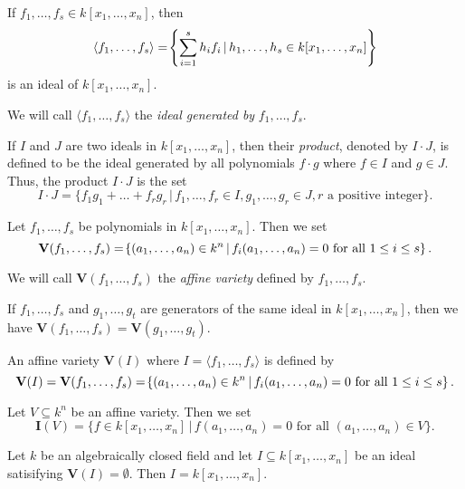 \documentclass[../main.tex]{subfiles}
\begin{document}
   \begin{lemma}
      If $f_1,\dots, f_s\in k[x_1,\dots,x_n]$, then 
      $$\langle f_1,\dots,f_s\rangle = \lr\{\}{\sum^s_{i=1}h_if_i\,|\,h_1,\dots,h_s\in k[x_1,\dots,x_n]}$$ 
      is an ideal of $k[x_1,\dots,x_n]$.
   \end{lemma}
   We will call $\langle f_1,\dots,f_s\rangle$ the \emph{ideal generated by} $f_1,\dots,f_s$.
   \begin{definition}
      If $I$ and $J$ are two ideals in $k[x_1,\dots,x_n]$, then their \emph{product}, denoted by $I\cdot J$, is defined to be the ideal generated by all polynomials $f\cdot g$ where $f\in I$ and $g\in J$. Thus, the product $I\cdot J$ is the set
      $$I\cdot J=\{f_1g_1+\dots+f_rg_r\,|\,f_1,\dots,f_r\in I, g_1,\dots,g_r\in J, r \text{ a positive integer}\}.$$
   \end{definition}
   \begin{definition}
      Let $f_1,\dots,f_s$ be polynomials in $k[x_1,\dots,x_n]$. Then we set
      $$\mathbf{V}(f_1,\dots,f_s) = \lr\{\}{(a_1,\dots,a_n)\in k^n \,|\, f_i(a_1,\dots,a_n)=0 \text{ for all $1\leq i\leq s$}}.$$
   \end{definition}
   We will call $\mathbf{V}(f_1,\dots,f_s)$ the \emph{affine variety} defined by $f_1,\dots,f_s$.
   \begin{lemma}
      If $f_1,\dots,f_s$ and $g_1,\dots,g_t$ are generators of the same ideal in $k[x_1,\dots,x_n]$, then we have $\mathbf{V}(f_1,\dots,f_s)=\mathbf{V}(g_1,\dots,g_t)$.
   \end{lemma}
   \begin{definition}
      An affine variety $\mathbf{V}(I)$ where $I=\langle f_1,\dots,f_s\rangle$ is defined by
      $$\mathbf{V}(I)=\mathbf{V}(f_1,\dots,f_s) = \lr\{\}{(a_1,\dots,a_n)\in k^n \, |\, f_i(a_1,\dots,a_n)=0 \text{ for all $1\leq i\leq s$}}.$$
   \end{definition}
   \begin{definition}
      Let $V\subseteq k^n$ be an affine variety. Then we set
      $$\mathbf{I}(V)=\{f\in k[x_1,\dots,x_n] \, |\, f(a_1,\dots,a_n)=0 \text{ for all $(a_1,\dots,a_n)\in V$}\}.$$
   \end{definition}

   \begin{theorem}
      Let $k$ be an algebraically closed field and let $I\subseteq k[x_1,\dots,x_n]$ be an ideal satisifying $\mathbf{V}(I)=\emptyset$. Then $I=k[x_1,\dots,x_n]$.
   \end{theorem}
\end{document}
